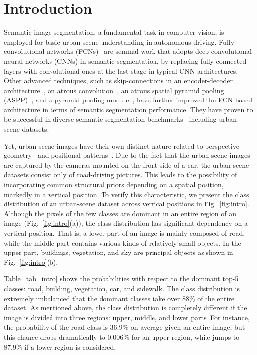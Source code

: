 \documentclass[10pt,twocolumn,letterpaper]{article}
\begin{document}
\section{Introduction} \label{sec:Intro}
\vspace{-0.1cm}
Semantic image segmentation, a fundamental task in computer vision, is employed for basic urban-scene understanding in autonomous driving. Fully convolutional networks (FCNs)~\cite{long2015fully} are 
seminal work that adopts deep convolutional neural networks (CNNs)
in semantic segmentation, by replacing fully connected layers with convolutional ones at the last stage in typical CNN architectures. Other advanced techniques, such as skip-connections in an encoder-decoder architecture~\cite{badrinarayanan2017segnet,ronneberger2015u,chen2018encoder}, an atrous convolution~\cite{chen2018deeplab, yu2015multi}, an atrous spatial pyramid pooling (ASPP)~\cite{chen2017rethinking}, and a pyramid pooling module~\cite{zhao2017pyramid}, have further improved the FCN-based architecture in terms of semantic segmentation performance. They have proven to be successful in diverse semantic segmentation benchmarks~\cite{everingham2010pascal,pascal-voc-2012,mottaghi2014role,cordts2016cityscapes,Alhaija2018IJCV,lin2014microsoft,neuhold2017mapillary} including urban-scene datasets.


Yet, urban-scene images have their own distinct nature related to perspective geometry~\cite{Li2017FoveaNetPU} and positional patterns~\cite{zou2018unsupervised,chen2018road}. Due to the fact that the urban-scene images are captured by the cameras mounted 
on the front side of a car, the urban-scene datasets consist only of road-driving pictures. This leads to the possibility of incorporating common structural priors depending on a spatial position, markedly 
in a vertical position. To verify this characteristic, we present the class distribution of an urban-scene dataset across vertical positions in Fig.~\ref{fig:intro}. Although the pixels of the few classes
are dominant in an entire region of an image (Fig.~\ref{fig:intro}(a)), the class distribution has significant dependency on a vertical position. That is, a lower part of an image is mainly composed of road, while 
the middle part contains various kinds of relatively small objects. In 
the upper part, buildings, vegetation, and sky are principal objects as shown in Fig.~\ref{fig:intro}(b).


Table~\ref{tab_intro} shows the probabilities with respect to the dominant top-5 classes: road, building, vegetation, car, and sidewalk. The class distribution is extremely imbalanced that the dominant classes take over 88\% of the entire dataset. As mentioned above, the class distribution is completely different if the image is divided into 
three regions: upper, middle, and lower parts. For instance, the probability of the road class  is 36.9\% on average given an entire image, but this chance drops dramatically to 0.006\% for an upper region, while jumps to 87.9\% if a lower region is considered. 
\end{document}
